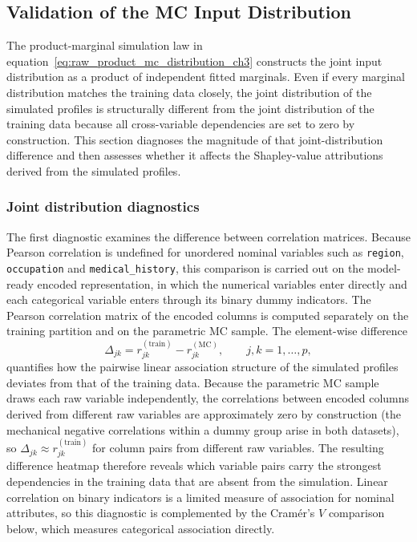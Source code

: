 \subsection{Validation of the MC Input Distribution}
\label{sec:mc_input_validation}

The product-marginal simulation law in
equation~\eqref{eq:raw_product_mc_distribution_ch3} constructs the joint
input distribution as a product of independent fitted marginals. Even if
every marginal distribution matches the training data closely, the joint
distribution of the simulated profiles is structurally different from the
joint distribution of the training data because all cross-variable
dependencies are set to zero by construction. This section diagnoses the
magnitude of that joint-distribution difference and then assesses whether it
affects the Shapley-value attributions derived from the simulated profiles.

\subsubsection{Joint distribution diagnostics}

The first diagnostic examines the difference between correlation
matrices.  Because Pearson correlation is undefined for unordered nominal
variables such as \texttt{region}, \texttt{occupation} and
\texttt{medical\_\allowbreak{}history}, this comparison is carried out on
the model-ready encoded representation, in which the numerical variables
enter directly and each categorical variable enters through its binary
dummy indicators.  The Pearson correlation matrix of the encoded columns
is computed separately on the training partition and on the parametric
MC sample. The element-wise difference
\begin{equation}
    \Delta_{jk}
    =
    r_{jk}^{(\mathrm{train})}
    -
    r_{jk}^{(\mathrm{MC})},
    \qquad
    j,k = 1,\ldots,p,
    \label{eq:correlation_difference_ch3}
\end{equation}
quantifies how the pairwise linear association structure of the simulated
profiles deviates from that of the training data. Because the parametric
MC sample draws each raw variable independently, the correlations
between encoded columns derived from different raw variables are
approximately zero by construction (the mechanical negative correlations
within a dummy group arise in both datasets), so
$\Delta_{jk} \approx r_{jk}^{(\mathrm{train})}$ for column pairs from
different raw variables. The resulting difference heatmap therefore
reveals which variable pairs carry the strongest dependencies in the
training data that are absent from the simulation.  Linear correlation on
binary indicators is a limited measure of association for nominal
attributes, so this diagnostic is complemented by the Cram\'{e}r's $V$
comparison below, which measures categorical association directly.

